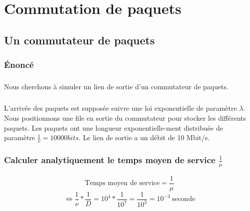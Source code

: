 %
\chapter{Commutation de paquets}
%
    \section{Un commutateur de paquets}
%
        \subsection{Énoncé}
%
            \paragraph{}
Nous cherchons à simuler un lien de sortie d'un commutateur de paquets.
%
            \paragraph{}
L'arrivée des paquets est supposée suivre une loi exponentielle de paramètre $\lambda$.
Nous positionnons une file en sortie du commutateur pour stocker les différents paquets.
Les paquets ont une longueur exponentielle-ment distribuée de paramètre $\frac{1}{\nu} = 10 000 bits$.
Le lien de sortie a un débit de 10 Mbit/s.
%
        \subsection{Calculer analytiquement le temps moyen de service $\frac{1}{\mu}$}
\[  \text{Temps moyen de service} = \frac{1}{\mu} \]
\[ \iff \frac{1}{\nu} * \frac{1}{D} = 10^{4} * \frac{1}{10^{7}} = \frac{1}{10^{3}} = 10^{-3} \ \text{seconde} \]
%
